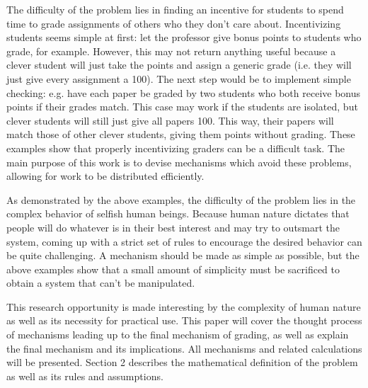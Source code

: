 \documentclass[12pt, Arial]{article}
\begin{document}
The difficulty of the problem lies in finding an incentive for students to spend time to grade assignments of others who they don't care about. Incentivizing students seems simple at first: let the professor give bonus points to students who grade, for example. However, this may not return anything useful because a clever student will just take the points and assign a generic grade (i.e. they will just give every assignment a 100). The next step would be to implement simple checking: e.g. have each paper be graded by two students who both receive bonus points if their grades match. This case may work if the students are isolated, but clever students will still just give all papers 100. This way, their papers will match those of other clever students, giving them points without grading. These examples show that properly incentivizing graders can be a difficult task. The main purpose of this work is to devise mechanisms which avoid these problems, allowing for work to be distributed efficiently.

As demonstrated by the above examples, the difficulty of the problem lies in the complex behavior of selfish human beings. Because human nature dictates that people will do whatever is in their best interest and may try to outsmart the system, coming up with a strict set of rules to encourage the desired behavior can be quite challenging. A mechanism should be made as simple as possible, but the above examples show that a small amount of simplicity must be sacrificed to obtain a system that can't be manipulated.

This research opportunity is made interesting by the complexity of human nature as well as its necessity for practical use. This paper will cover the thought process of mechanisms leading up to the final mechanism of grading, as well as explain the final mechanism and its implications. All mechanisms and related calculations will be presented. Section 2 describes the mathematical definition of the problem as well as its rules and assumptions.
\end{document}
